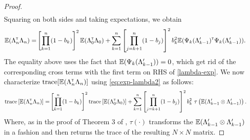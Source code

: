 \begin{proof}
\begin{align}
 \end{align}
Squaring on both sides and taking expectations, we obtain
 \begin{align}
  \mathbb{E} (\Lambda_n ^\mathsf{\scriptscriptstyle T} \Lambda_n) =  &\left[ \prod_{k=1}^n (1-b_k) \right]^2 \mathbb{E} (\Lambda_0 ^\mathsf{\scriptscriptstyle T} \Lambda_0) + \sum_{k=1}^n \left[\prod_{j=k+1}^n (1-b_j)\right]^2 b_k^2   \mathbb{E} (\Psi_k(\Lambda_{k-1}') ^\mathsf{\scriptscriptstyle T} \Psi_k(\Lambda_{k-1}')).\label{eq:exp-lambda2}
 \end{align}
The equality above uses the fact that $\mathbb{E}(\Psi_k(\Lambda_{k-1}'))=0$, which get rid of the corresponding cross terms with the first term on RHS of \eqref{lambda-exp}. %
We now characterize $\text{trace}[\mathbb{E}(\Lambda_n^\mathsf{\scriptscriptstyle T} \Lambda_n)]$ using \eqref{eq:exp-lambda2} as follows:
 \begin{align}\label{eq:trace}
 \text{trace} \left[\mathbb{E} (\Lambda_n ^\mathsf{\scriptscriptstyle T} \Lambda_n)\right] = &\left[ \prod_{k=1}^n (1-b_k) \right]^2 \text{trace} \left[\mathbb{E} (\Lambda_0 ^\mathsf{\scriptscriptstyle T} \Lambda_0)\right]  + \sum_{k=1}^n \left[\prod_{j=k+1}^n (1-b_j)\right]^2 b_k^2  \,\,\tau\left(\mathbb{E} (\Lambda_{k-1}' \otimes \Lambda_{k-1}')\right).
 \end{align}
Where, as in the proof of Theorem 3 of \cite{spall-jacobian}, $\tau(\cdot)$ transforms the $\mathbb{E} (\Lambda_{k-1}' \otimes \Lambda_{k-1}')$ in a  fashion and then returns the trace of the resulting $N\times N$ matrix.

\end{proof}
